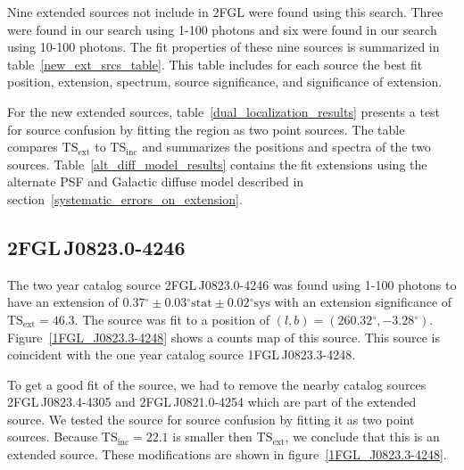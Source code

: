 \documentclass[12pt,preprint]{aastex}
\newcommand{\gev}{\text{GeV}\xspace}
\newcommand{\tsext}{{\ensuremath{\text{TS}_{\text{ext}}}}\xspace}
\newcommand{\tsinc}{\ensuremath{\text{TS}_{\text{inc}}}\xspace}
\newcommand{\sys}{\text{sys}\xspace}
\newcommand{\stat}{\text{stat}\xspace}
\renewcommand{\deg}{\ensuremath{^\circ}\xspace}
\begin{document}

Nine extended sources not include in 2FGL were found using this search.
Three were found in our search using 1-100 \gev photons and 
six were found in our search using 10-100 \gev photons.  
The fit properties of these nine sources is summarized in
table~\ref{new_ext_srcs_table}.  This table includes for each source
the best fit position, extension, spectrum, source significance, and
significance of extension. 

For the new extended sources, table~\ref{dual_localization_results}
presents a test for source confusion by fitting the region
as two point sources. The table compares \tsext to \tsinc and
summarizes the positions and spectra of the two sources. 
Table~\ref{alt_diff_model_results} contains the fit extensions
using the alternate PSF and Galactic diffuse model described in
section~\ref{systematic_errors_on_extension}.

\subsection{2FGL\,J0823.0-4246}
\label{section_2FGL_J0823.0-4246}


The two year catalog source 2FGL\,J0823.0-4246 was found 
using 1-100 \gev photons to have an 
extension of $0.37\deg\pm0.03\deg\stat\pm0.02\deg\sys$ 
with an extension
significance of $\tsext=46.3$.  The source was fit to a position of
$(l,b)=(260.32\deg,-3.28\deg)$.  Figure~\ref{1FGL_J0823.3-4248} shows a
counts map of this source.  This source is coincident with the one year
catalog source 1FGL\,J0823.3-4248.

To get a good fit of the source, we had to remove the nearby catalog
sources 2FGL\,J0823.4-4305 and 2FGL\,J0821.0-4254 which are part of the
extended source.  We tested the source for source confusion by fitting
it as two point sources. Because $\tsinc=22.1$ is smaller then \tsext,
we conclude that this is an extended source.  These modifications are
shown in figure~\ref{1FGL_J0823.3-4248}.
\end{document}
